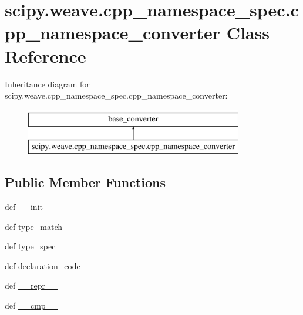 \hypertarget{classscipy_1_1weave_1_1cpp__namespace__spec_1_1cpp__namespace__converter}{}\section{scipy.\+weave.\+cpp\+\_\+namespace\+\_\+spec.\+cpp\+\_\+namespace\+\_\+converter Class Reference}
\label{classscipy_1_1weave_1_1cpp__namespace__spec_1_1cpp__namespace__converter}
Inheritance diagram for scipy.\+weave.\+cpp\+\_\+namespace\+\_\+spec.\+cpp\+\_\+namespace\+\_\+converter\+:\begin{figure}[H]
\begin{center}
\leavevmode
\includegraphics[height=2.000000cm]{classscipy_1_1weave_1_1cpp__namespace__spec_1_1cpp__namespace__converter}
\end{center}
\end{figure}
\subsection*{Public Member Functions}
\begin{DoxyCompactItemize}
\item 
def \hyperlink{classscipy_1_1weave_1_1cpp__namespace__spec_1_1cpp__namespace__converter_afd031848c55e3d476fa56fadb60896fe}{\+\_\+\+\_\+init\+\_\+\+\_\+}
\item 
def \hyperlink{classscipy_1_1weave_1_1cpp__namespace__spec_1_1cpp__namespace__converter_a3f85c7f80b3575c8e9f02ba5f1905aa3}{type\+\_\+match}
\item 
def \hyperlink{classscipy_1_1weave_1_1cpp__namespace__spec_1_1cpp__namespace__converter_a4fc4b15ca3323a87fec6db22e9338397}{type\+\_\+spec}
\item 
def \hyperlink{classscipy_1_1weave_1_1cpp__namespace__spec_1_1cpp__namespace__converter_ac83b8da6ff0231a335b29fc583167a97}{declaration\+\_\+code}
\item 
def \hyperlink{classscipy_1_1weave_1_1cpp__namespace__spec_1_1cpp__namespace__converter_a409cf02ef2ea08f6e4a20f1497936fda}{\+\_\+\+\_\+repr\+\_\+\+\_\+}
\item 
def \hyperlink{classscipy_1_1weave_1_1cpp__namespace__spec_1_1cpp__namespace__converter_ab4756880bc0de7af61cf118398f922d9}{\+\_\+\+\_\+cmp\+\_\+\+\_\+}
\end{DoxyCompactItemize}

